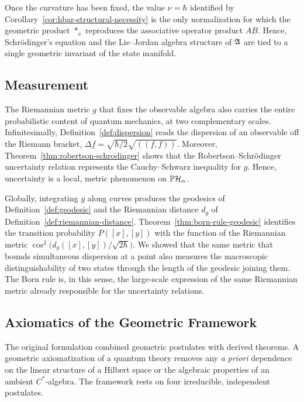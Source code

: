 Once the curvature has been fixed, the value $\nu=\hbar$ identified by Corollary~\ref{cor:hbar-structural-necessity} is the only normalization for which the geometric product $*_{\nu}$ reproduces the associative operator product $AB$. Hence, Schrödinger's equation and the Lie--Jordan algebra structure of $\mathfrak{A}$ are tied to a single geometric invariant of the state manifold.

\subsection*{Measurement}

The Riemannian metric $g$ that fixes the observable algebra also carries the entire probabilistic content of quantum mechanics, at two complementary scales. Infinitesimally, Definition~\ref{def:dispersion} reads the dispersion of an observable off the Riemann bracket, $\Delta f=\sqrt{\hbar/2}\sqrt{((f,f))}$. Moreover, Theorem~\ref{thm:robertson-schrodinger} shows that the Robertson--Schrödinger uncertainty relation represents the Cauchy--Schwarz inequality for $g$. Hence, uncertainty is a local,  metric phenomenon on $\PH_\alpha$.

Globally, integrating $g$ along curves produces the geodesics of Definition~\ref{def:geodesic} and the Riemannian distance $d_g$ of Definition~\ref{def:riemannian-distance}. Theorem~\ref{thm:born-rule-geodesic} identifies the transition probability $P([x],[y])$ with the function of the Riemannian metric $\cos^2\big(d_g([x],[y])/\sqrt{2\hbar}\big)$. We showed that the same metric that bounds simultaneous dispersion at a point also measures the macroscopic distinguishability of two states through the length of the geodesic joining them. The Born rule is, in this sense, the large-scale expression of the same Riemannian metric already responsible for the uncertainty relations.

\subsection*{Axiomatics of the Geometric Framework}

The original formulation combined geometric postulates with derived theorems. A geometric axiomatization of a quantum theory removes any \textit{a priori} dependence on the linear structure of a Hilbert space or the algebraic properties of an ambient $C^*$-algebra. The framework rests on four irreducible, independent postulates.


